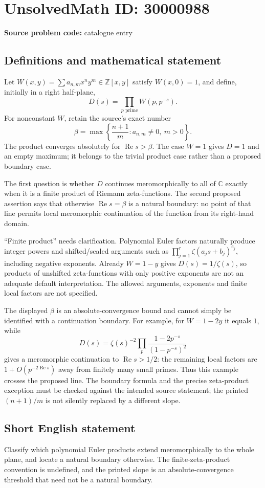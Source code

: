 \documentclass[11pt]{article}
\newcommand{\Z}{\mathbb{Z}}
\newcommand{\C}{\mathbb{C}}
\begin{document}
\section*{UnsolvedMath ID: 30000988}
\textbf{Source problem code:} catalogue entry
\subsection{Definitions and mathematical statement}
Let $W(x,y)=\sum a_{n,m}x^ny^m\in\Z[x,y]$ satisfy $W(x,0)=1$, and define, initially in a right half-plane,
\[
D(s)=\prod_{p\text{ prime}}W(p,p^{-s}).
\]
For nonconstant $W$, retain the source's exact number
\[
\beta=\max\left\{\frac{n+1}{m}:a_{n,m}\ne0,\ m>0\right\}.
\]
The product converges absolutely for $\operatorname{Re}s>\beta$. The case $W=1$ gives $D=1$ and an empty maximum; it belongs to the trivial product case rather than a proposed boundary case.

The first question is whether $D$ continues meromorphically to all of $\C$ exactly when it is a finite product of Riemann zeta-functions. The second proposed assertion says that otherwise $\operatorname{Re}s=\beta$ is a natural boundary: no point of that line permits local meromorphic continuation of the function from its right-hand domain.

``Finite product'' needs clarification. Polynomial Euler factors naturally produce integer powers and shifted/scaled arguments such as $\prod_{j=1}^{r}\zeta(a_js+b_j)^{e_j}$, including negative exponents. Already $W=1-y$ gives $D(s)=1/\zeta(s)$, so products of unshifted zeta-functions with only positive exponents are not an adequate default interpretation. The allowed arguments, exponents and finite local factors are not specified.

The displayed $\beta$ is an absolute-convergence bound and cannot simply be identified with a continuation boundary. For example, for $W=1-2y$ it equals $1$, while
\[
D(s)=\zeta(s)^{-2}\prod_p
\frac{1-2p^{-s}}{(1-p^{-s})^2}
\]
gives a meromorphic continuation to $\operatorname{Re}s>1/2$: the remaining local factors are $1+O(p^{-2\operatorname{Re}s})$ away from finitely many small primes. Thus this example crosses the proposed line. The boundary formula and the precise zeta-product exception must be checked against the intended source statement; the printed $(n+1)/m$ is not silently replaced by a different slope.
\subsection{Short English statement}
Classify which polynomial Euler products extend meromorphically to the whole plane, and locate a natural boundary otherwise. The finite-zeta-product convention is undefined, and the printed slope is an absolute-convergence threshold that need not be a natural boundary.
\end{document}
